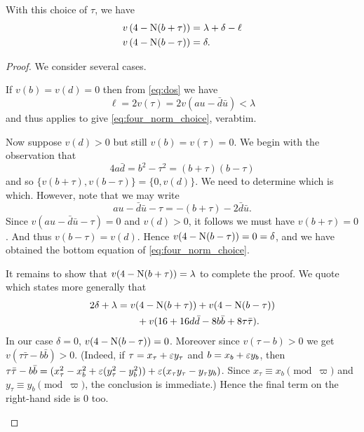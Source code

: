 \begin{lemma}
  With this choice of $\tau$, we have
  \begin{equation}
    \begin{aligned}
      v\left( 4 - \operatorname{N}(b+\tau) \right) &= \lambda + \delta - \ell \\
      v\left( 4 - \operatorname{N}(b-\tau) \right) &= \delta.
    \end{aligned}
    \label{eq:four_norm_choice}
  \end{equation}
\end{lemma}
\begin{proof}
  We consider several cases.
  \begin{itemize}
  \ii If $v(b) = v(d) = 0$ then from \eqref{eq:dos} we have
  \[ \ell = 2v(\tau) = 2v(au - \bar d \bar u) < \lambda \]
  and thus \cite[Lemma 4.7]{ref:AFL} applies to give \eqref{eq:four_norm_choice}, verabtim.

  \ii Now suppose $v(d) > 0$ but still $v(b) = v(\tau) = 0$.
  We begin with the observation that
  \begin{equation}
    4 a \bar d = b^2 - \tau^2 = (b + \tau)(b - \tau)
    \label{eq:tau_which_which}
  \end{equation}
  and so $\{v(b+\tau), v(b-\tau)\} = \{0, v(d)\}$.
  We need to determine which is which.
  However, note that we may write
  \[ au - \bar d \bar u - \tau = -(b + \tau) - 2 \bar d \bar u. \]
  Since $v(au - \bar d \bar u - \tau) = 0$ and $v(d) > 0$,
  it follows we must have $v(b+\tau) = 0$.
  And thus $v(b-\tau) = v(d)$.
  Hence $v(4 - \operatorname{N}(b-\tau)) = 0 = \delta$,
  and we have obtained the bottom equation of \eqref{eq:four_norm_choice}.

  It remains to show that $v(4-\operatorname{N}(b+\tau)) = \lambda$ to complete the proof.
  We quote \cite[Lemma 4.6]{ref:AFL} which states more generally that
  \begin{align*}
    2\delta + \lambda
    &= v(4-\operatorname{N}(b+\tau)) + v(4-\operatorname{N}(b-\tau)) \\
    &\qquad+ v(16 + 16 d \bar d - 8 b \bar b + 8 \tau \bar\tau).
  \end{align*}
  In our case $\delta = 0$, $v(4-\operatorname{N}(b-\tau)) = 0$.
  Moreover since $v(\tau - b) > 0$ we get $v(\tau\bar\tau - b \bar b) > 0$.
  (Indeed, if $\tau = x_\tau + \varepsilon y_\tau$ and $b = x_b + \varepsilon y_b$,
  then $\tau\bar\tau - b \bar b = (x_\tau^2 - x_b^2 + \varepsilon(y_\tau^2 - y_b^2))
  + \varepsilon(x_\tau y_\tau - y_\tau y_b)$.
  Since $x_\tau \equiv x_b \pmod{\varpi}$ and $y_\tau \equiv y_b \pmod{\varpi}$,
  the conclusion is immediate.)
  Hence the final term on the right-hand side is $0$ too.


\end{itemize}
\end{proof}
